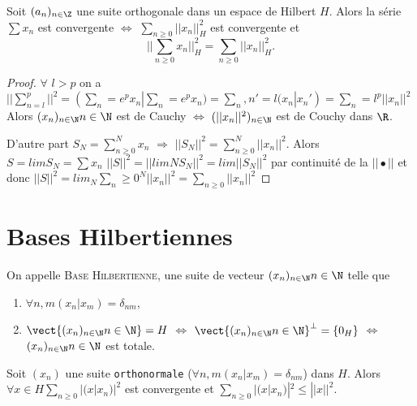 \begin{theorem}
	Soit $(a_n)_{n\in \Z}$ une suite orthogonale dans un espace de Hilbert $H$. Alors la série $∑x_n$ est convergente $\Longleftrightarrow$ $∑_{n≥0}||x_n||_H^2$ est convergente et \[ ||∑_{n≥0}x_n||^2_H=∑_{n≥0}||x_n||_H^2.\]
\end{theorem}
\begin{proof}
	$\forall$ $l>p$ on a $||∑_{n=l}^p||^2=(∑_n=e^p x_n | ∑_n=e^p x_n)=∑_n,n'=l(x_n|x_n')=∑_n=l^p||x_n||^2$ Alors $(x_n)_{n\in\N}{n\in \N}$ est de Cauchy $\Leftrightarrow$ $(||x_n||^2)_{n\in \N}$ est de Couchy dans $\R$.

D'autre part $S_N=∑_{n≥0}^N x_n$ $\Rightarrow$  $||S_N||^2=∑_{n≥0}^N||x_n||^2$.
Alors $S=lim S_N=∑x_n$ $||S||^2=||lim N S_N||^2=lim ||S_N||^2$ par continuité de la $||•||$ et donc $||S||^2=lim_N∑_n≥0^N||x_n||^2=∑_{n≥0}||x_n||^2$
\end{proof}

\section{Bases Hilbertiennes} %

\begin{definition}

	On appelle \textsc{Base Hilbertienne}, une suite de vecteur $(x_n)_{n\in\N}{n\in \N}$ telle que 

	\begin{enumerate}
		\item $\forall n, m (x_n|x_m)=δ_{nm}$,
		\item $\vect\{(x_n)_{n\in\N}n\in\N\}=H$ $\Leftrightarrow$ $\vect{(x_n)_{n\in\N}{n\in \N}}^\perp=\{0_H\}$ $\Leftrightarrow$ $(x_n)_{n\in\N}{n\in \N}$ est totale.
	\end{enumerate}
\end{definition}

\begin{theorem}
	Soit $(x_n)$ une suite \texttt{orthonormale} ($\forall n, m (x_n|x_m)=δ_{nm}$) dans $H$. Alors $\forall x\in H ∑_{n≥0}|(x|x_n)|^2$ est convergente et $∑_{n≥0}|(x|x_n)|^2≤||x||^2$.
\end{theorem}

